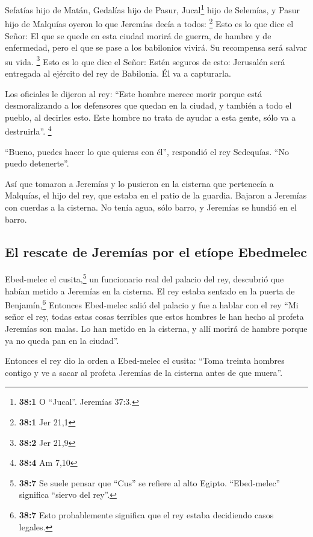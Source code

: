  Sefatías hijo de Matán, Gedalías hijo de Pasur,
Jucal\footnote{\textbf{38:1} O ``Jucal''. Jeremías 37:3.} hijo de
Selemías, y Pasur hijo de Malquías oyeron lo que Jeremías decía a todos:
\footnote{\textbf{38:1} Jer 21,1}  Esto es lo que dice el
Señor: El que se quede en esta ciudad morirá de guerra, de hambre y de
enfermedad, pero el que se pase a los babilonios vivirá. Su recompensa
será salvar su vida. \footnote{\textbf{38:2} Jer 21,9} 
Esto es lo que dice el Señor: Estén seguros de esto: Jerusalén será
entregada al ejército del rey de Babilonia. Él va a capturarla.

 Los oficiales le dijeron al rey: ``Este hombre merece
morir porque está desmoralizando a los defensores que quedan en la
ciudad, y también a todo el pueblo, al decirles esto. Este hombre no
trata de ayudar a esta gente, sólo va a destruirla''. \footnote{\textbf{38:4}
  Am 7,10}

 ``Bueno, puedes hacer lo que quieras con él'', respondió
el rey Sedequías. ``No puedo detenerte''.

 Así que tomaron a Jeremías y lo pusieron en la cisterna
que pertenecía a Malquías, el hijo del rey, que estaba en el patio de la
guardia. Bajaron a Jeremías con cuerdas a la cisterna. No tenía agua,
sólo barro, y Jeremías se hundió en el barro.

\hypertarget{el-rescate-de-jeremuxedas-por-el-etuxedope-ebedmelec}{%
\subsection{El rescate de Jeremías por el etíope
Ebedmelec}\label{el-rescate-de-jeremuxedas-por-el-etuxedope-ebedmelec}}

 Ebed-melec el cusita,\footnote{\textbf{38:7} Se suele
  pensar que ``Cus'' se refiere al alto Egipto. ``Ebed-melec'' significa
  ``siervo del rey''.} un funcionario real del palacio del rey,
descubrió que habían metido a Jeremías en la cisterna. El rey estaba
sentado en la puerta de Benjamín,\footnote{\textbf{38:7} Esto
  probablemente significa que el rey estaba decidiendo casos legales.}
 Entonces Ebed-melec salió del palacio y fue a hablar con
el rey  ``Mi señor el rey, todas estas cosas terribles que
estos hombres le han hecho al profeta Jeremías son malas. Lo han metido
en la cisterna, y allí morirá de hambre porque ya no queda pan en la
ciudad''.

 Entonces el rey dio la orden a Ebed-melec el cusita:
``Toma treinta hombres contigo y ve a sacar al profeta Jeremías de la
cisterna antes de que muera''.

